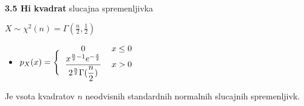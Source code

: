 \documentclass{article}
\begin{document}
\begin{multicols}{3}
\textbf{3.5 Hi kvadrat} slucajna spremenljivka
\begin{center}
    \begin{math}
        X \sim  \chi^{2}(n) = \Gamma(\frac{n}{2}, \frac{1}{2})
    \end{math}
\end{center}

\begin{itemize}
    \item  \begin{math}
        p_{X}(x) =
        \Bigg\{\begin{tabular}{ccc}
          $0$  & $x \leq 0$ & \\
          $\dfrac{x^{\frac{n}{2} - 1} e ^{- \frac{x}{2}}}{2^{\frac{n}{2}} \Gamma(\dfrac{n}{2})}$ & $x > 0$ & \\
        \end{tabular}
    \end{math} 
\end{itemize}

Je vsota kvadratov $n$ neodvisnih standardnih normalnih slucajnih spremenljivk.
\bigskip


\end{multicols}
\end{document}
